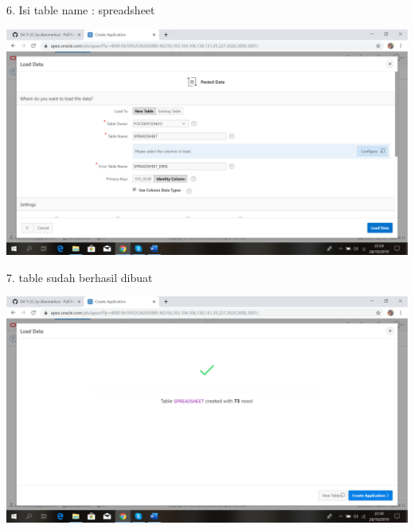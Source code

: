 \documentclass{article}
\begin{document}
    \item 6. Isi table name : spreadsheet
\begin{center}
    \includegraphics[width=10cm\textwidth]{gambar/8.png}
\end{center}
\newpage
\item 7. table sudah berhasil dibuat
\begin{center}
  \includegraphics[width=10cm\textwidth]{gambar/9.png}
\end{center}
   
\end{document}
